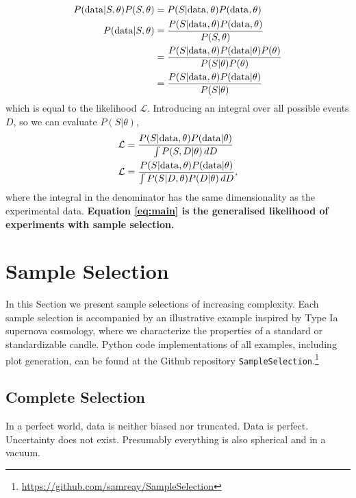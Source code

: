 \documentclass[a4paper,fleqn,usenatbib]{mnras}
\begin{document}
\begin{align}
P({\rm data} | S , \theta) P(S, \theta) &= P(S | {\rm data}, \theta) P({\rm data}, \theta)\\
P({\rm data} | S , \theta) &= \frac{ P(S | {\rm data}, \theta) P({\rm data}, \theta) }{ P(S, \theta) }\\
 &= \frac{ P(S | {\rm data}, \theta) P({\rm data} | \theta) P(\theta)}{ P(S | \theta)  P(\theta)}\\
 &= \frac{ P(S | {\rm data}, \theta) P({\rm data} | \theta)}{ P(S | \theta) }
\end{align}
which is equal to the likelihood $\mathcal{L}$. Introducing an integral over all possible events $D$, so we can evaluate $P(S|\theta)$, 
\begin{align}
\mathcal{L}&= \frac{P(S|{\rm data},\theta) P({\rm data}|\theta)}{\int P(S, D|\theta)\, dD} \\
\mathcal{L} &= \frac{P(S|{\rm data},\theta) P({\rm data}|\theta)}{\int P(S | D, \theta) P(D|\theta)\, dD}, \label{eq:main}
\end{align}
where the integral in the denominator has the same dimensionality as the experimental data. \textbf{Equation \ref{eq:main} is the generalised likelihood of experiments with sample selection.}




\section{Sample Selection}
\label{sec:examples}

In this Section we present sample selections of increasing complexity. Each sample selection is accompanied by an illustrative example inspired by Type Ia supernova cosmology, where we characterize the properties of a standard or standardizable candle. Python code implementations of all examples, including plot generation, can be found at the Github repository \verb|SampleSelection|.\footnote{\url{https://github.com/samreay/SampleSelection}}
 
 
\subsection{Complete Selection}
\label{sec:perfect}
In a perfect world, data is neither biased nor truncated. Data is perfect. Uncertainty does not exist. Presumably everything is also spherical and in a vacuum.
\end{document}
